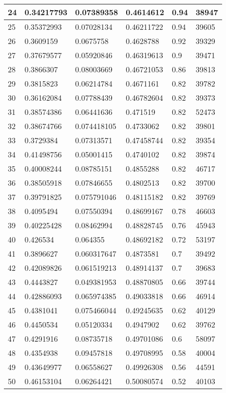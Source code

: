 \begin{longtable}{|l|l|l|l|l|l|}
24 & 0.34217793 & 0.07389358 & 0.4614612 & 0.94 & 38947 \\ \hline 
25 & 0.35372993 & 0.07028134 & 0.46211722 & 0.94 & 39605 \\ \hline 
26 & 0.3609159 & 0.0675758 & 0.4628788 & 0.92 & 39329 \\ \hline 
27 & 0.37679577 & 0.05920846 & 0.46319613 & 0.9 & 39471 \\ \hline 
28 & 0.3866307 & 0.08003669 & 0.46721053 & 0.86 & 39813 \\ \hline 
29 & 0.3815823 & 0.06214784 & 0.4671161 & 0.82 & 39782 \\ \hline 
30 & 0.36162084 & 0.07788439 & 0.46782604 & 0.82 & 39373 \\ \hline 
31 & 0.38574386 & 0.06441636 & 0.471519 & 0.82 & 52473 \\ \hline 
32 & 0.38674766 & 0.074418105 & 0.4733062 & 0.82 & 39801 \\ \hline 
33 & 0.3729384 & 0.07313571 & 0.47458744 & 0.82 & 39354 \\ \hline 
34 & 0.41498756 & 0.05001415 & 0.4740102 & 0.82 & 39874 \\ \hline 
35 & 0.40008244 & 0.08785151 & 0.4855288 & 0.82 & 46717 \\ \hline 
36 & 0.38505918 & 0.07846655 & 0.4802513 & 0.82 & 39700 \\ \hline 
37 & 0.39791825 & 0.075791046 & 0.48115182 & 0.82 & 39769 \\ \hline 
38 & 0.4095494 & 0.07550394 & 0.48699167 & 0.78 & 46603 \\ \hline 
39 & 0.40225428 & 0.08462994 & 0.48828745 & 0.76 & 45943 \\ \hline 
40 & 0.426534 & 0.064355 & 0.48692182 & 0.72 & 53197 \\ \hline 
41 & 0.3896627 & 0.060317647 & 0.4873581 & 0.7 & 39492 \\ \hline 
42 & 0.42089826 & 0.061519213 & 0.48914137 & 0.7 & 39683 \\ \hline 
43 & 0.4443827 & 0.049381953 & 0.48870805 & 0.66 & 39744 \\ \hline 
44 & 0.42886093 & 0.065974385 & 0.49033818 & 0.66 & 46914 \\ \hline 
45 & 0.4381041 & 0.075466044 & 0.49245635 & 0.62 & 40129 \\ \hline 
46 & 0.4450534 & 0.05120334 & 0.4947902 & 0.62 & 39762 \\ \hline 
47 & 0.4291916 & 0.08735718 & 0.49701086 & 0.6 & 58097 \\ \hline 
48 & 0.4354938 & 0.09457818 & 0.49708995 & 0.58 & 40004 \\ \hline 
49 & 0.43649977 & 0.06558627 & 0.49926308 & 0.56 & 44591 \\ \hline 
50 & 0.46153104 & 0.06264421 & 0.50080574 & 0.52 & 40103 \\ \hline 
\end{longtable}